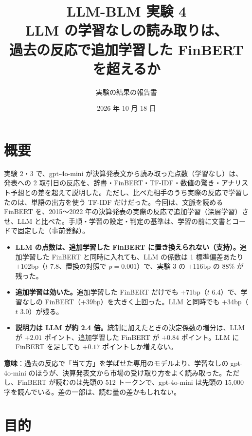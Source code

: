 \documentclass[xelatex,ja=standard,jafont=haranoaji,a4paper,10pt,openany]{bxjsreport}
\title{LLM-BLM 実験 4\\[6pt]
  \large LLM の学習なしの読み取りは、\\過去の反応で追加学習した FinBERT を超えるか}
\author{実験の結果の報告書}
\date{2026 年 10 月 18 日}
\begin{document}
\maketitle

\chapter*{概要}

実験 2・3 で、gpt-4o-mini が決算発表文から読み取った点数（学習なし）は、発表への 2 取引日の反応を、辞書・FinBERT・TF-IDF・数値の驚き・アナリスト予想との差を超えて説明した。ただし、比べた相手のうち実際の反応で学習したのは、単語の出方を使う TF-IDF だけだった。今回は、文脈を読める FinBERT を、2015〜2022 年の決算発表の実際の反応で追加学習（深層学習）させ、LLM と比べた。手順・学習の設定・判定の基準は、学習の前に文書とコードで固定した（事前登録）。

\begin{keybox}[主な結論]
\begin{itemize}
\item \textbf{LLM の点数は、追加学習した FinBERT に置き換えられない（支持）。}追加学習した FinBERT と同時に入れても、LLM の係数は 1 標準偏差あたり $+102$bp（$t$ 7.8、置換の対照で $p=0.001$）で、実験 3 の $+116$bp の 88\% が残った。
\item \textbf{追加学習は効いた。}追加学習した FinBERT だけでも $+71$bp（$t$ 6.4）で、学習なしの FinBERT（$+39$bp）を大きく上回った。LLM と同時でも $+34$bp（$t$ 3.0）が残る。
\item \textbf{説明力は LLM が約 2.4 倍。}統制に加えたときの決定係数の増分は、LLM が $+2.01$ ポイント、追加学習した FinBERT が $+0.84$ ポイント。LLM に FinBERT を足しても $+0.17$ ポイントしか増えない。
\end{itemize}
\end{keybox}

\textbf{意味}：過去の反応で「当て方」を学ばせた専用のモデルより、学習なしの gpt-4o-mini のほうが、決算発表文から市場の受け取り方をよく読み取った。ただし、FinBERT が読むのは先頭の 512 トークンで、gpt-4o-mini は先頭の 15,000 字を読んでいる。差の一部は、読む量の差かもしれない。

\setcounter{tocdepth}{1}
{\small\tableofcontents}

\chapter{目的}\label{ch:intro}
\end{document}
